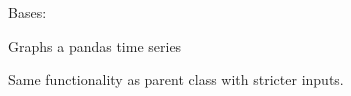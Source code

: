 \documentclass[letterpaper,10pt,english]{sphinxmanual}
\begin{document}
\begin{fulllineitems}
\label{\detokenize{dalio.application:dalio.application.graphers.PandasTSGrapher}}
Bases: {\hyperref[\detokenize{dalio.application:dalio.application.graphers.PandasXYGrapher}]{}}

Graphs a pandas time series

Same functionality as parent class with stricter inputs.

\end{fulllineitems}

\end{document}
